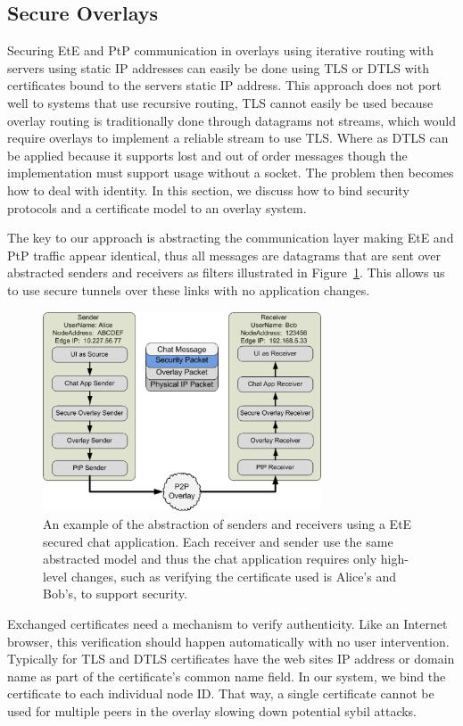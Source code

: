 \documentclass[conference]{IEEEtran}
\begin{document}
\subsection{Secure Overlays}
\label{secure_overlays}
Securing EtE and PtP communication in overlays using iterative routing with
servers using static IP addresses can easily be done using TLS or DTLS with
certificates bound to the servers static IP address.  This approach does not
port well to systems that use recursive routing, TLS cannot easily be used
because overlay routing is traditionally done through datagrams not streams,
which would require overlays to implement a reliable stream to use TLS.  Where
as DTLS can be applied because it supports lost and out of order messages though
the implementation must support usage without a socket.  The
problem then becomes how to deal with identity.  In this section, we discuss how
to bind security protocols and a certificate model to an overlay system.

The key to our approach is abstracting the communication layer making EtE and
PtP traffic appear identical, thus all messages are datagrams that are sent
over abstracted senders and receivers as filters illustrated in
Figure~\ref{fig:senders_receivers}.  This allows us to use secure tunnels over
these links with no application changes.

\begin{figure}[h]
\centering
\includegraphics[width=3.25in]{secure_sender_stack_generic.png.eps}
\caption{An example of the abstraction of senders and receivers using a EtE 
secured chat application.  Each receiver and sender use the same abstracted
model and thus the chat application requires only high-level changes, such
as verifying the certificate used is Alice's and Bob's, to support security.}
\label{fig:senders_receivers}
\end{figure}

Exchanged certificates need a mechanism to verify authenticity.  Like an
Internet browser, this verification should happen automatically with no user
intervention.  Typically for TLS and DTLS certificates have the web sites
IP address or domain name as part of the certificate's common name field.  In
our system, we bind the certificate to each individual node ID.  That way,
a single certificate cannot be used for multiple peers in the overlay slowing
down potential sybil attacks.
\end{document}
